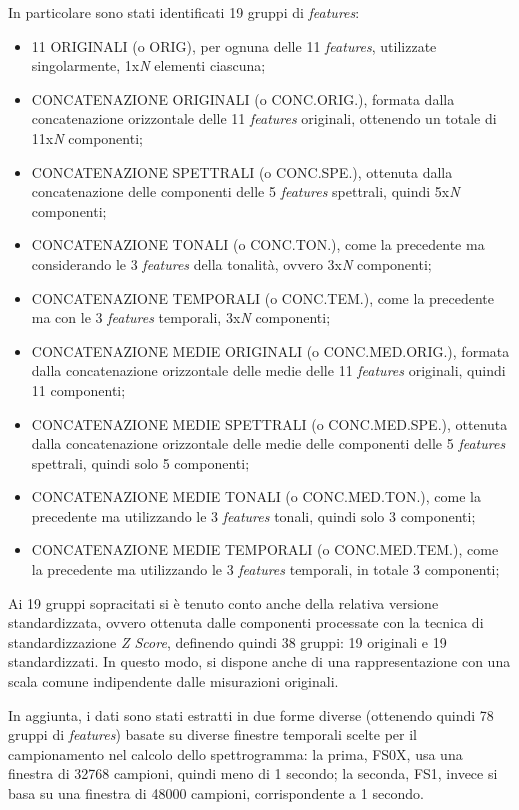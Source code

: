 In particolare sono stati identificati 19 gruppi di \textit{features}:
\begin{itemize}
	\item{11 ORIGINALI (o ORIG), per ognuna delle 11 \textit{features}, utilizzate singolarmente, 1x\textit{N} elementi ciascuna;}
	\item{CONCATENAZIONE ORIGINALI (o CONC.ORIG.), formata dalla concatenazione
	orizzontale delle 11 \textit{features} originali, ottenendo un totale di 11x\textit{N} componenti;}
	\item{CONCATENAZIONE SPETTRALI (o CONC.SPE.), ottenuta dalla concatenazione
	delle componenti delle 5 \textit{features} spettrali, quindi 5x\textit{N} componenti;}
	\item{CONCATENAZIONE TONALI (o CONC.TON.), come la precedente ma
	considerando le 3 \textit{features} della tonalità, ovvero 3x\textit{N} componenti;}
	\item{CONCATENAZIONE TEMPORALI (o CONC.TEM.), come la precedente ma con le
	3 \textit{features} temporali, 3x\textit{N} componenti;}
	\item{CONCATENAZIONE MEDIE ORIGINALI (o CONC.MED.ORIG.), formata dalla
	concatenazione orizzontale delle medie delle 11 \textit{features} originali, quindi 11
	componenti;}
	\item{CONCATENAZIONE MEDIE SPETTRALI (o CONC.MED.SPE.), ottenuta dalla
	concatenazione orizzontale delle medie delle componenti delle 5 \textit{features} spettrali,
	quindi solo 5 componenti;}
	\item{CONCATENAZIONE MEDIE TONALI (o CONC.MED.TON.), come la precedente
	ma utilizzando le 3 \textit{features} tonali, quindi solo 3 componenti;}
	\item{CONCATENAZIONE MEDIE TEMPORALI (o CONC.MED.TEM.), come la
	precedente ma utilizzando le 3 \textit{features} temporali, in totale 3 componenti;}
\end{itemize}

Ai 19 gruppi sopracitati si è tenuto conto anche della relativa versione standardizzata, ovvero
ottenuta dalle componenti processate con la tecnica di standardizzazione \textit{Z Score}, definendo
quindi 38 gruppi: 19 originali e 19 standardizzati. In questo modo, si dispone anche di una
rappresentazione con una scala comune indipendente dalle misurazioni originali.

In aggiunta, i dati sono stati estratti in due forme diverse (ottenendo quindi 78 gruppi di
\textit{features}) basate su diverse finestre temporali scelte per il campionamento nel calcolo dello
spettrogramma: la prima, FS0X, usa una finestra di 32768 campioni, quindi meno di 1
secondo; la seconda, FS1, invece si basa su una finestra di 48000 campioni, corrispondente a
1 secondo.

